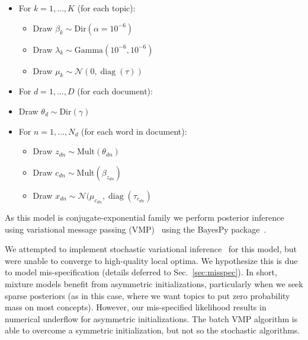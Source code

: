 \documentclass[11pt]{article}
\DeclareMathOperator{\diag}{diag}
\begin{document}
\begin{itemize}
\item For $k = 1, \ldots, K$ (for each topic):
  \begin{itemize}
    \item Draw $\beta_k \sim \mbox{Dir}(\alpha=10^{-6})$
    \item Draw $\lambda_k \sim \mbox{Gamma}(10^{-6}, 10^{-6})$
    \item Draw $\mu_k \sim \mathcal{N}(0, \diag(\tau))$
  \end{itemize}
\item For $d = 1, \ldots, D$ (for each document):
  \item Draw $\theta_d \sim \mbox{Dir}(\gamma)$
  \item For $n = 1, \ldots, N_d$ (for each word in document):
  \begin{itemize}
    \item Draw $z_{dn} \sim \mbox{Mult}(\theta_{dn})$
    \item Draw $c_{dn} \sim \mbox{Mult}(\beta_{z_{dn}})$
    \item Draw $x_{dn} \sim \mathcal{N}(\mu_{c_{dn}}, \diag(\tau_{c_{dn}})$
  \end{itemize}
\end{itemize}

As this model is conjugate-exponential family we perform posterior inference using variational message passing (VMP)~\cite{Winn05} using the BayesPy package~\cite{Luttinen14}.

We attempted to implement stochastic variational inference~\cite{Hoffman13} for this model, but were unable to converge to high-quality local optima. We hypothesize this is due to model mis-specification (details deferred to Sec.~\ref{sec:misspec}). In short, mixture models benefit from asymmetric initializations, particularly when we seek sparse posteriors (as in this case, where we want topics to put zero probability mass on most concepts). However, our mis-specified likelihood results in numerical underflow for asymmetric initializations. The batch VMP algorithm is able to overcome a symmetric initialization, but not so the stochastic algorithms.
\end{document}
